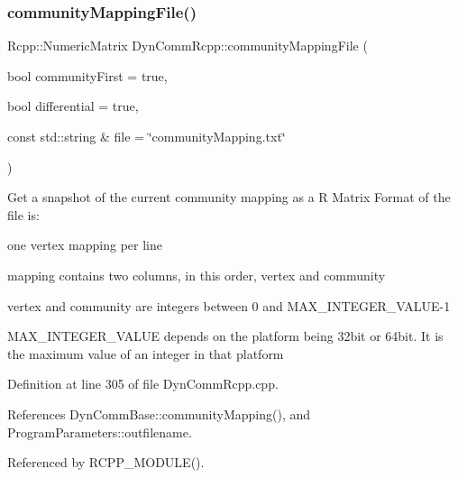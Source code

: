 \subsubsection{\texorpdfstring{community\+Mapping\+File()}{communityMappingFile()}}
{\footnotesize\ttfamily Rcpp\+::\+Numeric\+Matrix Dyn\+Comm\+Rcpp\+::community\+Mapping\+File (\begin{DoxyParamCaption}\item[{bool}]{community\+First = {\ttfamily true},  }\item[{bool}]{differential = {\ttfamily true},  }\item[{const std\+::string \&}]{file = {\ttfamily \char`\"{}communityMapping.txt\char`\"{}} }\end{DoxyParamCaption})\hspace{0.3cm}{\ttfamily [inline]}}

Get a snapshot of the current community mapping as a R Matrix Format of the file is\+:
\begin{DoxyItemize}
\item one vertex mapping per line
\item mapping contains two columns, in this order, vertex and community
\item vertex and community are integers between 0 and M\+A\+X\+\_\+\+I\+N\+T\+E\+G\+E\+R\+\_\+\+V\+A\+L\+U\+E-\/1
\item M\+A\+X\+\_\+\+I\+N\+T\+E\+G\+E\+R\+\_\+\+V\+A\+L\+UE depends on the platform being 32bit or 64bit. It is the maximum value of an integer in that platform 
\end{DoxyItemize}

Definition at line 305 of file Dyn\+Comm\+Rcpp.\+cpp.



References Dyn\+Comm\+Base\+::community\+Mapping(), and Program\+Parameters\+::outfilename.



Referenced by R\+C\+P\+P\+\_\+\+M\+O\+D\+U\+L\+E().

